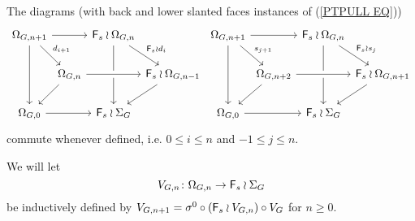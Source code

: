\documentclass[a4paper,10pt]{article}%
\begin{document}
\begin{remark}\label{DSCOM REM}
The diagrams (with back and lower slanted faces instances of (\ref{PTPULL EQ}))
	\[
	\begin{tikzcd}[column sep = 0.1em]
		\Omega_{G,{n+1}} \ar{rr} \ar{rd}{d_{i+1}} \ar{dd}
		 & & \Fin_s \wr \Omega_{G,{n}} \ar{rd}{\Fin_s \wr d_i} \ar{dd} & &
		\Omega_{G,{n+1}} \ar{rr} \ar{rd}{s_{j+1}} \ar{dd} 
		& & \Fin_s \wr \Omega_{G,{n}} \ar{rd}{\Fin_s \wr s_{j}} \ar{dd} &
	\\
		& \Omega_{G,{n}} \ar{ld} \ar[crossing over]{rr} 
		& & \Fin_s \wr \Omega_{G,{n-1}} \ar{ld} &
		& \Omega_{G,{n+2}} \ar{ld} \ar[crossing over]{rr} 
		& & \Fin_s \wr \Omega_{G,{n+1}} \ar{ld}
	\\
		 \Omega_{G,0} \ar{rr} & & \Fin_s \wr \Sigma_G & &
		 \Omega_{G,0} \ar{rr} & & \Fin_s \wr \Sigma_G &
	\end{tikzcd}
	\]
commute whenever defined, i.e. 
$0 \leq i  \leq n $ and 
$-1 \leq j \leq n$.
\end{remark}

\begin{notation}\label{INDVNG NOT}
	We will let 
\[
	V_{G,n} \colon \Omega_{G,n} \to \mathsf{F}_s \wr \Sigma_G
\]
be inductively defined by 
$V_{G,n+1} = \sigma^0 \circ (\mathsf{F}_s \wr V_{G,n}) \circ V_G$ for $n \geq 0$.
\end{notation}
\end{document}
